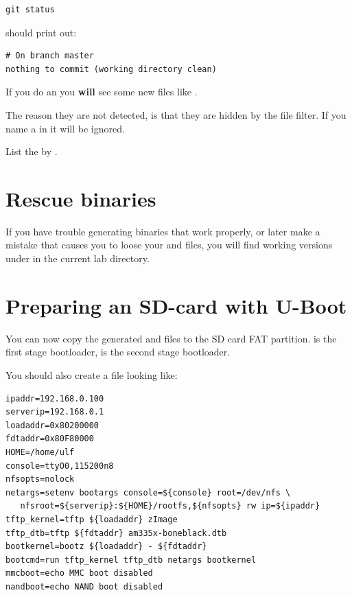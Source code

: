 {\small
\begin{verbatim}
git status
\end{verbatim}
}

should print out:

\begin{verbatim}
# On branch master
nothing to commit (working directory clean)
\end{verbatim}

If you do an  you {\bf will} see some new files like .

The reason they are not detected, is that they are hidden by the  file 
filter. If you name a  in  it will be ignored.

List the  by .

\section{Rescue binaries}

If you have trouble generating binaries that work properly, or later
make a mistake that causes you to loose your  and
 files, you will find working versions under
 in the current lab directory.

\clearpage

\section{Preparing an SD-card with U-Boot}
You can now copy the generated  and  files
to the SD card FAT partition.  is the first stage bootloader,
 is the second stage bootloader.

You should also create a file  looking like:

\begin{verbatim}
ipaddr=192.168.0.100
serverip=192.168.0.1
loadaddr=0x80200000
fdtaddr=0x80F80000
HOME=/home/ulf
console=ttyO0,115200n8
nfsopts=nolock
netargs=setenv bootargs console=${console} root=/dev/nfs \
   nfsroot=${serverip}:${HOME}/rootfs,${nfsopts} rw ip=${ipaddr}
tftp_kernel=tftp ${loadaddr} zImage
tftp_dtb=tftp ${fdtaddr} am335x-boneblack.dtb
bootkernel=bootz ${loadaddr} - ${fdtaddr}
bootcmd=run tftp_kernel tftp_dtb netargs bootkernel
mmcboot=echo MMC boot disabled
nandboot=echo NAND boot disabled
\end{verbatim}

